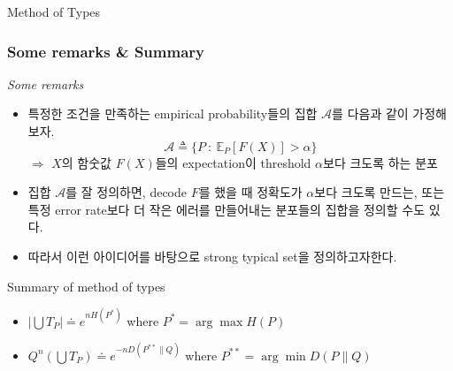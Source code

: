 \documentclass[9pt]{beamer}
\begin{document}
\begin{section}{Method of Types}
\begin{frame}
        \end{frame}

        \begin{frame}
            \frametitle{Some remarks \& Summary}
            \textit{Some remarks}
            \vspace{0.2cm}
            \begin{itemize}
                \item 특정한 조건을 만족하는 empirical probability들의 집합 $\mathcal A$를 다음과 같이 가정해보자.
                $$ \mathcal A \triangleq \{P \ : \ \mathbb E_P [F(X)] > \alpha \}$$
                $\Rightarrow$ $X$의 함숫값 $F(X)$들의 expectation이 threshold $\alpha$보다 크도록 하는 분포
                \item 집합 $\mathcal A$를 잘 정의하면, decode $F$를 했을 때 정확도가 $\alpha$보다 크도록 만드는, 또는 특정 error rate보다 더 작은 에러를 만들어내는 분포들의 집합을 정의할 수도 있다.
                \item 따라서 이런 아이디어를 바탕으로 strong typical set을 정의하고자한다.
            \end{itemize}
            \vspace{0.3cm}
            \begin{block}{Summary of method of types}
                \begin{itemize}
                    \item $|\bigcup T_P| \doteq e^{nH(P^*)}$ where $P^* = \arg\max H(P)$
                    \item $Q^n(\bigcup T_P) \doteq e^{-nD(P^{**} \| Q)}$ where $P^{**} = \arg\min D(P\| Q)$
                \end{itemize}
            \end{block}
        \end{frame}
    \end{section}
\end{document}
